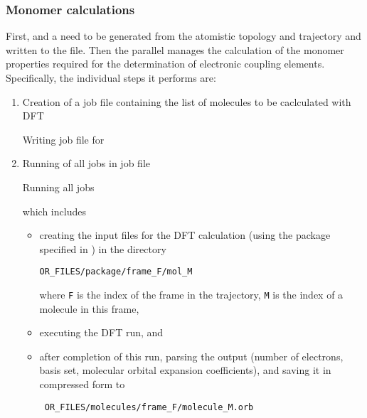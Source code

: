 \subsubsection{Monomer calculations}
\label{sec:edft}
First,  and a  need to be generated from the atomistic topology and trajectory and written to the \sqlstate file. Then the parallel  \calculator manages the calculation of the monomer properties required for the determination of electronic coupling elements. Specifically, the individual steps it performs are:
%
\begin{enumerate}
\item Creation of a job file containing the list of molecules to be caclculated with DFT 
\begin{bclogo}[couleur=bgblue, arrondi =0 , logo=\bcinfo, barre=line,noborder=true]{\small Writing job file for }
\itshape {\small \ctpparallel \opt \xmloptions \sql \sqlstate \exe {} \job \wrt }
\end{bclogo}
\item Running of all jobs in job file 
\begin{bclogo}[couleur=bgblue, arrondi =0 , logo=\bcinfo, barre=line,noborder=true]{\small Running all  jobs}
\itshape {\small \ctpparallel \opt \xmloptions \sql \sqlstate \exe {} \job \run }
\end{bclogo}
which includes
\begin{itemize}
\item creating the input files for the DFT calculation (using the package specified in \xmloptions) in the directory 
\begin{verbatim}
OR_FILES/package/frame_F/mol_M
\end{verbatim}
where {\tt F} is the index of the frame in the trajectory, {\tt M} is the index of a molecule in this frame,
\item executing the DFT run, and
\item after completion of this run, parsing the output (number of electrons, basis set, molecular orbital expansion coefficients), and saving it in compressed form to 
\begin{verbatim}
 OR_FILES/molecules/frame_F/molecule_M.orb 
\end{verbatim}
\end{itemize}
\end{enumerate}


